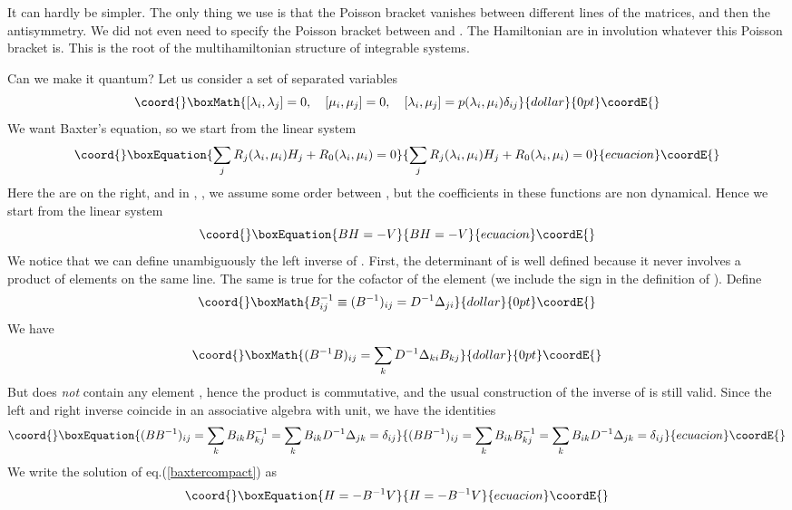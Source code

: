 \documentclass[a4paper,11pt]{article}
\begin{document}
It can hardly be simpler. The only thing we use is that the Poisson bracket
vanishes between different lines of the matrices, and then the antisymmetry.
We did not even need to specify the Poisson bracket  between \coordHE{} and 
\coordHE{}. The Hamiltonian are in involution whatever this Poisson bracket is.
This is the root of the multihamiltonian structure of integrable systems.


Can we make it quantum? Let us consider a set of separated variables
$$\coord{}\boxMath{
\relax [ \lambda_i,\lambda_j ] = 0, \quad [ \mu_i,\mu_j] =0, \quad
[ \lambda_i,\mu_j]  = p(\lambda_i, \mu_i) \delta_{ij}
}{dollar}{0pt}\coordE{}$$
We want Baxter's equation, so we start 
from the linear system
\begin{equation}\coord{}\boxEquation{
\sum_j R_j(\lambda_i,\mu_i) H_j + R_0(\lambda_i,\mu_i) = 0
\label{baxter}
}{
\sum_j R_j(\lambda_i,\mu_i) H_j + R_0(\lambda_i,\mu_i) = 0
}{ecuacion}\coordE{}\end{equation}
Here the \coordHE{} are on the right, and in \coordHE{}, 
\coordHE{}, we assume some order between \coordHE{},
but the coefficients in these functions are non dynamical. Hence we start from the linear system
\begin{equation}\coord{}\boxEquation{
B H = -V
\label{baxtercompact}
}{
B H = -V
}{ecuacion}\coordE{}\end{equation}
We notice that we can define unambiguously the left inverse of \coordHE{}.
First, the determinant \coordHE{} of \coordHE{} is well defined because it never 
involves a product of elements on the same line. The same is true
for the cofactor \coordHE{} of the element  \coordHE{} (we include the sign \coordHE{} in the definition of \coordHE{}). 
Define
$$\coord{}\boxMath{
B^{-1}_{ij} \equiv (B^{-1})_{ij} = D^{-1} \Delta_{ji}
}{dollar}{0pt}\coordE{}$$
We have 
$$\coord{}\boxMath{
(B^{-1} B)_{ij} = \sum_k D^{-1} \Delta_{ki} B_{kj}
}{dollar}{0pt}\coordE{}$$
But \coordHE{} does {\em not} contain any element \coordHE{}, hence
the product \coordHE{} is commutative, and the usual 
construction of the inverse of \coordHE{} is still valid. Since the left and right
inverse coincide in an associative algebra with unit, we have the identities
\begin{equation}\coord{}\boxEquation{
(BB^{-1})_{ij}=\sum_k  B_{ik} B^{-1}_{kj}
=\sum_k B_{ik} D^{-1} \Delta_{jk} = \delta_{ij}
\label{identityone}
}{
(BB^{-1})_{ij}=\sum_k  B_{ik} B^{-1}_{kj}
=\sum_k B_{ik} D^{-1} \Delta_{jk} = \delta_{ij}
}{ecuacion}\coordE{}\end{equation}
We write the solution of eq.(\ref{baxtercompact}) as
\begin{equation}\coord{}\boxEquation{
H = - B^{-1} V
\label{commutingquantities}
}{
H = - B^{-1} V
}{ecuacion}\coordE{}\end{equation}
\end{document}
